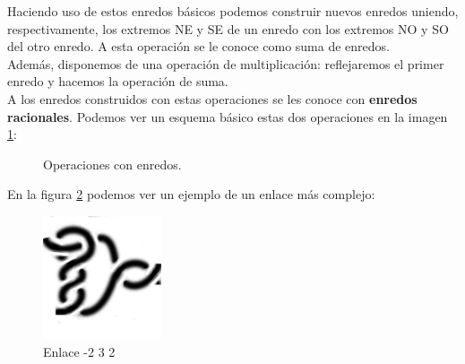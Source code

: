 \documentclass[14pt]{extarticle}
\begin{document}
Haciendo uso de estos enredos básicos podemos construir nuevos enredos uniendo, respectivamente, los extremos NE y SE de un enredo con los extremos NO y SO del otro enredo. A esta operación se le conoce como suma de enredos.\\
Además, disponemos de una operación de multiplicación: reflejaremos el primer enredo y hacemos la operación de suma.\\
A los enredos construidos con estas operaciones se les conoce con \textbf{enredos racionales}. Podemos ver un esquema básico estas dos operaciones en la imagen \ref{conw3}:\\
   \begin{figure}[h!]
   	\centering
   	\caption{Operaciones con enredos.}
   	\label{conw3} 
   \end{figure}

En la figura \ref{conw4} podemos ver un ejemplo de un enlace más complejo:
\begin{figure}[h!]
	\centering
	\includegraphics[width=3.5cm]{inudos/en5fin.png}
	\caption{Enlace -2 3 2}
	\label{conw4} 
\end{figure}
\end{document}
